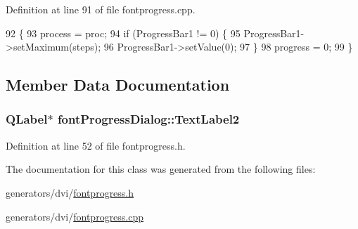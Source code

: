 Definition at line 91 of file fontprogress.\+cpp.


\begin{DoxyCode}
92 \{
93   process = proc;
94   \textcolor{keywordflow}{if} (ProgressBar1 != 0) \{
95     ProgressBar1->setMaximum(steps);
96     ProgressBar1->setValue(0);
97   \}
98   progress = 0;
99 \}
\end{DoxyCode}


\subsection{Member Data Documentation}
\hypertarget{classfontProgressDialog_a6f93e7f3d73d7b90fbad9216f3958b56}{
\subsubsection[{Text\+Label2}]{\setlength{\rightskip}{0pt plus 5cm}Q\+Label$\ast$ font\+Progress\+Dialog\+::\+Text\+Label2}}\label{classfontProgressDialog_a6f93e7f3d73d7b90fbad9216f3958b56}


Definition at line 52 of file fontprogress.\+h.



The documentation for this class was generated from the following files\+:\begin{DoxyCompactItemize}
\item 
generators/dvi/\hyperlink{fontprogress_8h}{fontprogress.\+h}\item 
generators/dvi/\hyperlink{fontprogress_8cpp}{fontprogress.\+cpp}\end{DoxyCompactItemize}
